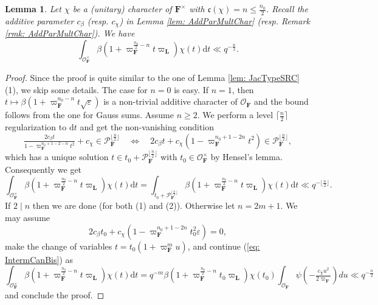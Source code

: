 \documentclass[A4]{amsart}
\def\leq{\leqslant}
\def\geq{\geqslant}
\newtheorem{lemma}      [theorem]{Lemma}
\numberwithin{equation}{section} \everymath{\displaystyle}
\newcommand{\ud}{\mathrm{d}}
\newcommand{\F}{\mathbf{F}}
\newcommand{\bL}{\mathbf{L}}
\newcommand{\vO}{\mathcal{O}}
\newcommand{\vP}{\mathcal{P}}
\newcommand{\cond}{\mathfrak{c}}
\begin{document}
\begin{lemma} \label{lem: JacTypeSRCBis}
	Let $\chi$ be a (unitary) character of $\F^{\times}$ with $\cond(\chi)=n \leq \tfrac{n_0}{2}$. Recall the additive parameter $c_{\beta}$ (resp. $c_{\chi}$) in Lemma \ref{lem: AddParMultChar} (resp. Remark \ref{rmk: AddParMultChar}). We have
	$$ \int_{\vO_{\F}^{\times}} \beta \left( 1+\varpi_{\F}^{\frac{n_0}{2}-n} t \varpi_{\bL} \right) \chi(t) \ud t \ll q^{-\frac{n}{2}}. $$
\end{lemma}
\begin{proof}
	Since the proof is quite similar to the one of Lemma \ref{lem: JacTypeSRC} (1), we skip some details. The case for $n=0$ is easy. If $n=1$, then $t \mapsto \beta \left( 1+ \varpi_{\F}^{n_0-n} t \sqrt{\varepsilon} \right)$ is a non-trivial additive character of $\vO_{\F}$ and the bound follows from the one for Gauss sums. Assume $n \geq 2$. We perform a level $\lceil \tfrac{n}{2} \rceil$ regularization to $\ud t$ and get the non-vanishing condition
	$$ \tfrac{2 c_{\beta} t}{1-\varpi_{\F}^{n_0+1-2-n} t^2} + c_{\chi} \in \vP_{\F}^{\lfloor \frac{n}{2} \rfloor} \quad \Leftrightarrow \quad 2 c_{\beta} t + c_{\chi}(1-\varpi_{\F}^{n_0+1-2n} t^2) \in \vP_{\F}^{\lfloor \frac{n}{2} \rfloor}, $$
	which has a unique solution $t \in t_0 + \vP_{\F}^{\lfloor \frac{n}{2} \rfloor}$ with $t_0 \in \vO_{\F}^{\times}$ by Hensel's lemma. Consequently we get
\begin{equation} \label{eq: IntermCanBis}
	\int_{\vO_{\F}^{\times}} \beta \left( 1+\varpi_{\F}^{\frac{n_0}{2}-n} t \varpi_{\bL} \right) \chi(t) \ud t = \int_{t_0 + \vP_{\F}^{\lfloor \frac{n}{2} \rfloor}} \beta \left( 1+\varpi_{\F}^{\frac{n_0}{2}-n} t \varpi_{\bL} \right) \chi(t) \ud t \ll q^{-\lfloor \frac{n}{2} \rfloor}.
\end{equation}
	If $2 \mid n$ then we are done (for both (1) and (2)). Otherwise let $n=2m+1$. We may assume
	$$ 2 c_{\beta} t_0 + c_{\chi}(1-\varpi_{\F}^{n_0+1-2n} t_0^2 \varepsilon) = 0, $$
	make the change of variables $t = t_0(1+\varpi_{\F}^m u)$, and continue (\ref{eq: IntermCanBis}) as
	$$ \int_{\vO_{\F}^{\times}} \beta \left( 1+\varpi_{\F}^{\frac{n_0}{2}-n} t \varpi_{\bL} \right) \chi(t) \ud t = q^{-m} \beta \left( 1+\varpi_{\F}^{\frac{n_0}{2}-n} t_0 \varpi_{\bL} \right) \chi(t_0) \int_{\vO_{\F}} \psi \left( -\tfrac{c_{\chi}u^2}{2 \varpi_{\F}} \right) du \ll q^{-\frac{n}{2}} $$
	and conclude the proof.
\end{proof}
	
\end{document}
